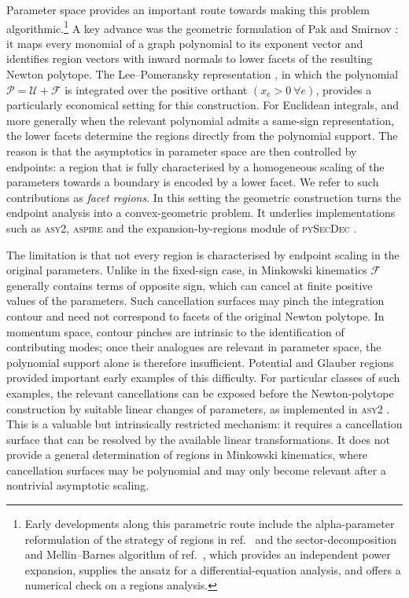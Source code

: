 \documentclass[a4paper,11pt]{article}
\begin{document}
Parameter space provides an important route towards making this problem
algorithmic.\footnote{Early developments along this parametric route include the
alpha-parameter reformulation of the strategy of regions in
ref.~\cite{Smirnov:1999bza} and the sector-decomposition and Mellin--Barnes
algorithm of ref.~\cite{Pilipp:2008power}, which provides an independent
power expansion, supplies the ansatz for a differential-equation analysis,
and offers a numerical check on a regions analysis.}  A key advance
was the geometric formulation of Pak and Smirnov \cite{Pak:2010pt}: it maps
every monomial of a graph polynomial to its exponent vector and identifies
region vectors with inward normals to lower facets of the resulting Newton
polytope.  The Lee--Pomeransky
representation \cite{Lee:2013hzt}, in which the polynomial
\(\mathcal P=\mathcal U+\mathcal F\) is integrated over the positive orthant
\((x_e>0\ \forall e)\),
provides a particularly economical setting for this construction.  For
Euclidean integrals, and more generally when the relevant polynomial admits a
same-sign representation, the lower facets determine the regions directly
from the polynomial support.  The reason is that the asymptotics in parameter
space are then controlled by endpoints: a region that is fully characterised
by a homogeneous scaling of the parameters towards a boundary is encoded by
a lower facet.  We refer to such contributions as \emph{facet regions}.  In
this setting the geometric construction turns the endpoint analysis into a
convex-geometric problem.  It underlies implementations such as
\textsc{asy2}, \textsc{aspire} and the
expansion-by-regions module of \textsc{pySecDec}
\cite{Jantzen:2012mw,Ananthanarayan:2018tog,Heinrich:2021dbf}.

The limitation is that not every region is characterised by endpoint scaling
in the original parameters.  Unlike in the fixed-sign case, in Minkowski
kinematics \(\mathcal F\) generally contains terms of opposite sign, which can
cancel at finite positive values of the parameters.  Such cancellation
surfaces may pinch the integration contour and need not correspond to facets
of the original Newton polytope.  In momentum space, contour pinches are
intrinsic to the identification of contributing modes; once their analogues
are relevant in parameter space, the polynomial support alone is therefore
insufficient.  Potential and Glauber regions provided important early
examples of this difficulty.
For particular classes of such examples, the relevant cancellations can be
exposed before the Newton-polytope construction by suitable linear changes of
parameters, as implemented in \textsc{asy2} \cite{Jantzen:2012mw}.
This is a valuable but intrinsically restricted mechanism: it requires a
cancellation surface that can be resolved by the available linear
transformations.  It does not provide a general determination of regions in
Minkowski kinematics, where cancellation surfaces may be polynomial and may
only become relevant after a nontrivial asymptotic scaling.
\end{document}
